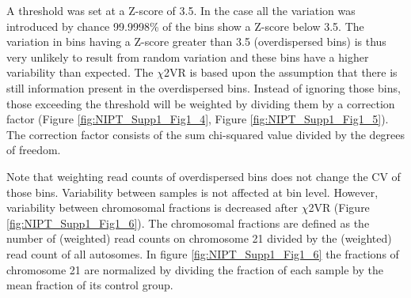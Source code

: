 A threshold was set at a Z-score of 3.5. In the case all the variation was introduced by chance 99.9998\% of the bins show a Z-score below 3.5. 
The variation in bins having a Z-score greater than 3.5 (overdispersed bins) is thus very unlikely to result from random variation and these bins
have a higher variability than expected. The $\chi$2VR is based upon the assumption that there is still information present in the overdispersed bins. 
Instead of ignoring those bins, those exceeding the threshold will be weighted by dividing them by a correction factor (Figure \ref{fig:NIPT_Supp1_Fig1_4}, Figure \ref{fig:NIPT_Supp1_Fig1_5}).
The correction factor consists of the sum chi-squared value divided by the degrees of freedom.

Note that weighting read counts of overdispersed bins does not change the CV of those bins.
Variability between samples is not affected at bin level. However, variability between chromosomal fractions is decreased after $\chi$2VR (Figure \ref{fig:NIPT_Supp1_Fig1_6}).
The chromosomal fractions are defined as the number of (weighted) read counts on chromosome 21 divided by the (weighted) read count of all autosomes. 
In figure \ref{fig:NIPT_Supp1_Fig1_6} the fractions of chromosome 21 are normalized by dividing the fraction of each sample by the mean fraction of its control group.

